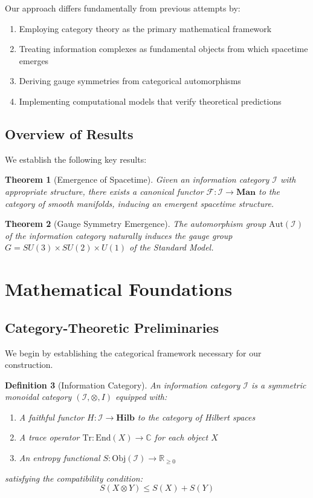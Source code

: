 \documentclass[12pt,a4paper]{article}
\newtheorem{theorem}{Theorem}[section]
\newtheorem{definition}[theorem]{Definition}
\begin{document}
Our approach differs fundamentally from previous attempts by:
\begin{enumerate}
\item Employing category theory as the primary mathematical framework
\item Treating information complexes as fundamental objects from which spacetime emerges
\item Deriving gauge symmetries from categorical automorphisms
\item Implementing computational models that verify theoretical predictions
\end{enumerate}

\subsection{Overview of Results}

We establish the following key results:

\begin{theorem}[Emergence of Spacetime]
Given an information category $\mathcal{I}$ with appropriate structure, there exists a canonical functor $\mathcal{F}: \mathcal{I} \to \mathbf{Man}$ to the category of smooth manifolds, inducing an emergent spacetime structure.
\end{theorem}

\begin{theorem}[Gauge Symmetry Emergence]
The automorphism group $\text{Aut}(\mathcal{I})$ of the information category naturally induces the gauge group $G = SU(3) \times SU(2) \times U(1)$ of the Standard Model.
\end{theorem}

\section{Mathematical Foundations}

\subsection{Category-Theoretic Preliminaries}

We begin by establishing the categorical framework necessary for our construction.

\begin{definition}[Information Category]
An \emph{information category} $\mathcal{I}$ is a symmetric monoidal category $(\mathcal{I}, \otimes, I)$ equipped with:
\begin{enumerate}
\item A faithful functor $H: \mathcal{I} \to \mathbf{Hilb}$ to the category of Hilbert spaces
\item A trace operator $\text{Tr}: \text{End}(X) \to \mathbb{C}$ for each object $X$
\item An entropy functional $S: \text{Obj}(\mathcal{I}) \to \mathbb{R}_{\geq 0}$
\end{enumerate}
satisfying the compatibility condition:
\begin{equation}
S(X \otimes Y) \leq S(X) + S(Y)
\end{equation}
\end{definition}
\end{document}
